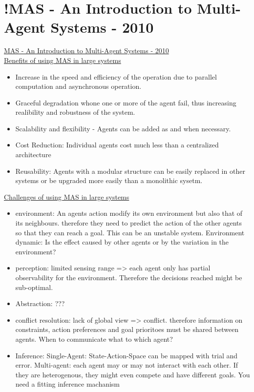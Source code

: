 \section{!MAS - An Introduction to Multi-Agent Systems - 2010}
\href{https://link.springer.com/chapter/10.1007/978-3-642-14435-6_1}{MAS - An Introduction to Multi-Agent Systems - 2010}
\\
\underline{Benefits of using MAS in large systems}
\begin{itemize}[noitemsep,nolistsep]
	\item Increase in the speed and efficiency of the operation due to parallel computation and asynchronous operation.
	\item Graceful degradation whone one or more of the agent fail, thus increasing realibility and robustness of the system.
	\item Scalability and flexibility - Agents can be added as and when necessary.
	\item Cost Reduction: Individual agents cost much less than a centralized architecture
	\item Reusability: Agents with a modular structure can be easily replaced in other systems or be upgraded more easily than a monolithic sysetm.
\end{itemize}
\underline{Challenges of using MAS in large systems}
\begin{itemize}[noitemsep,nolistsep]
	\item environment: An agents action modify its own environment but also that of its neighbours. therefore they need to predict the action of the other agents so that they can reach a goal. This can be an unstable system. Environment dynamic: Is the effect caused by other agents or by the variation in the environment?
	\item perception: limited sensing range => each agent only has partial observability for the environment. Therefore the decisions reached might be sub-optimal.
	\item Abstraction: ???
	\item conflict resolution: lack of global view => conflict. therefore information on constraints, action preferences and goal prioritoes must be shared between agents. When to communicate what to which agent?
	\item Inference: Single-Agent: State-Action-Space can be mapped with trial and error. Multi-agent: each agent may or may not interact with each other. If they are heterogenous, they might even compete and have different goals. You need a fitting inference machanism
\end{itemize}
